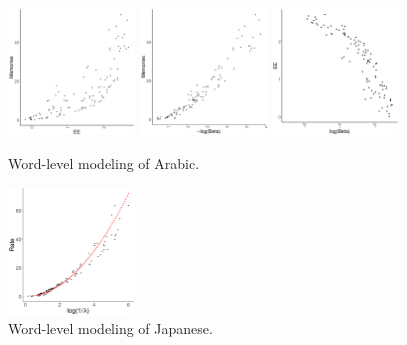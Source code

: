 \documentclass[11pt,letterpaper]{article}
\begin{document}
\begin{figure}
\includegraphics[width=0.3\textwidth]{code/figures/ar-words-ee-mem.pdf}
\includegraphics[width=0.3\textwidth]{code/figures/ar-words-logbeta-mem.pdf}
\includegraphics[width=0.3\textwidth]{code/figures/ar-words-logbeta-ee.pdf}
	\caption{Word-level modeling of Arabic.}\label{fig:jap-logbeta}
\end{figure}






\begin{figure}
\includegraphics[width=0.3\textwidth]{code/figures/LDC95T8-words-nlogbeta-mem-fitted.pdf}
	\caption{Word-level modeling of Japanese.}\label{fig:jap-logbeta-fit}
\end{figure}
\end{document}
